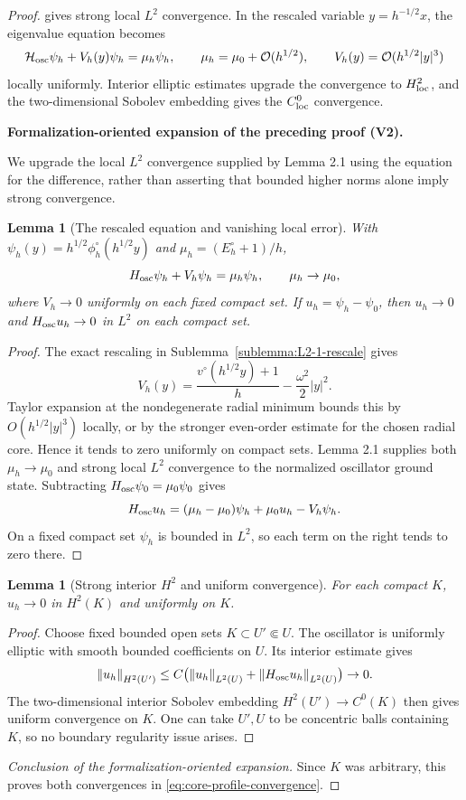 \documentclass[11pt]{article}
\newtheorem{lemma}[theorem]{Lemma}
\newcommand{\formalisationparentid}{X}
\newenvironment{formalisationaddition}[1]{\par\medskip\begingroup\color{blue}\def\formalisationparentid{#1}\setcounter{formalizationsublemma}{0}\let\lemma\formalizationsublemma\let\endlemma\endformalizationsublemma
  \def\Eo{\mathcal E_h^\circ}\def\EE{\mathcal E_h}\def\phio{\phi_h^\circ}\def\phih{\phi_h}\def\Ho{H_h^{\rm atom}(v^\circ)}\def\Ha{H_h^{\rm atom}}\def\HL{H_h^{L}}\def\Dh{D_h}\def\Log{\operatorname{Log}}\def\ellh{\ell_h}\def\Gp{G_{p,h}}\def\Ast{A_{*,h}}\def\ahat{\widehat{\mathfrak a}_h}\def\ah{\mathfrak a_h}\def\rh{\widehat\rho_h}\def\deltah{\widehat\delta_h}\def\oldref##1{\textup{(##1)}}\def\interface##1{\par\noindent\textit{Analytical interface used here.} ##1\par}\def\finish{\par\noindent\textit{Conclusion of the formalization-oriented expansion.} }\par\noindent\textbf{Formalization-oriented expansion of the preceding proof (V2).}\par\smallskip
}{\par\endgroup\medskip
}
\newcommand{\cO}{\mathcal O}
\newcommand{\norm}[1]{\left\|#1\right\|}
\begin{document}
\begin{proof}
 gives strong local $L^2$ convergence.  In
the rescaled variable $y=h^{-1/2}x$, the eigenvalue equation
becomes
\[
 \mathcal H_{\rm osc}\psi_h+V_h(y)\psi_h=\mu_h\psi_h,
 \qquad \mu_h=\mu_0+\cO(h^{1/2}),
 \qquad V_h(y)=\cO(h^{1/2}|y|^3)
\]
locally uniformly.  Interior elliptic estimates upgrade the convergence to
$H^2_{\rm loc}$, and the two-dimensional Sobolev embedding gives the
$C^0_{\rm loc}$ convergence.

\begin{formalisationaddition}{LB.1}
We upgrade the local $L^2$ convergence supplied by Lemma 2.1 using the equation for the difference, rather than asserting that bounded higher norms alone imply strong convergence.

\begin{lemma}[The rescaled equation and vanishing local error]\label{sublemma:LB-1-equation}
With $\psi_h(y)=h^{1/2}\phio(h^{1/2}y)$ and $\mu_h=(E_h^\circ+1)/h$,
\[
 H_{\rm osc}\psi_h+V_h\psi_h=\mu_h\psi_h,
 \qquad \mu_h\to\mu_0,
\]
where $V_h\to0$ uniformly on each fixed compact set. If $u_h=\psi_h-\psi_0$, then $u_h\to0$ and $H_{\rm osc}u_h\to0$ in $L^2$ on each compact set.
\end{lemma}
\begin{proof}
The exact rescaling in Sublemma~\ref{sublemma:L2-1-rescale} gives
\[
 V_h(y)=\frac{v^\circ(h^{1/2}y)+1}{h}-\frac{\omega^2}{2}|y|^2.
\]
Taylor expansion at the nondegenerate radial minimum bounds this by $O(h^{1/2}|y|^3)$ locally, or by the stronger even-order estimate for the chosen radial core. Hence it tends to zero uniformly on compact sets. Lemma 2.1 supplies both $\mu_h\to\mu_0$ and strong local $L^2$ convergence to the normalized oscillator ground state. Subtracting $H_{\rm osc}\psi_0=\mu_0\psi_0$ gives
\[
 H_{\rm osc}u_h=(\mu_h-\mu_0)\psi_h+\mu_0u_h-V_h\psi_h.
\]
On a fixed compact set $\psi_h$ is bounded in $L^2$, so each term on the right tends to zero there.
\end{proof}

\begin{lemma}[Strong interior $H^2$ and uniform convergence]\label{sublemma:LB-1-interior}
For each compact $K$, $u_h\to0$ in $H^2(K)$ and uniformly on $K$.
\end{lemma}
\begin{proof}
Choose fixed bounded open sets $K\subset U'\Subset U$. The oscillator is uniformly elliptic with smooth bounded coefficients on $U$. Its interior estimate gives
\[
 \norm{u_h}_{H^2(U')}\le C\bigl(\norm{u_h}_{L^2(U)}
                               +\norm{H_{\rm osc}u_h}_{L^2(U)}\bigr)\to0.
\]
The two-dimensional interior Sobolev embedding $H^2(U')\to C^0(K)$ then gives uniform convergence on $K$. One can take $U',U$ to be concentric balls containing $K$, so no boundary regularity issue arises.
\end{proof}
\finish Since $K$ was arbitrary, this proves both convergences in \eqref{eq:core-profile-convergence}.
\end{formalisationaddition}

\end{proof}
\end{document}
